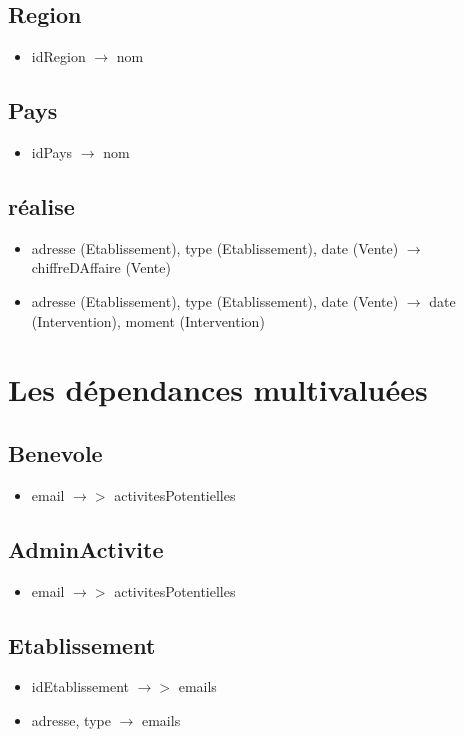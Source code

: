 \documentclass[asi, sansVersion]{picInsa}
\begin{document}
\subsection*{Region}
\begin{itemize}
\item[] idRegion $\rightarrow$ nom
\end{itemize}

\subsection*{Pays}
\begin{itemize}
\item[] idPays $\rightarrow$ nom
\end{itemize}
 

\subsection*{réalise}
\begin{itemize}
\item[] adresse (Etablissement), type (Etablissement), date (Vente) $\rightarrow$ chiffreDAffaire (Vente)
\item[] adresse (Etablissement), type (Etablissement), date (Vente) $\rightarrow$ date (Intervention), moment (Intervention)
\end{itemize}

\section{Les dépendances multivaluées}

\subsection*{Benevole}
\begin{itemize}
\item[] email $\rightarrow > $ activitesPotentielles 
\end{itemize}

\subsection*{AdminActivite}
\begin{itemize}
\item[]email $\rightarrow >$ activitesPotentielles 
\end{itemize}

\subsection*{Etablissement}
\begin{itemize}
\item[] idEtablissement $\rightarrow >$ emails
\item[] adresse, type $\rightarrow$ emails
\end{itemize}
\end{document}
